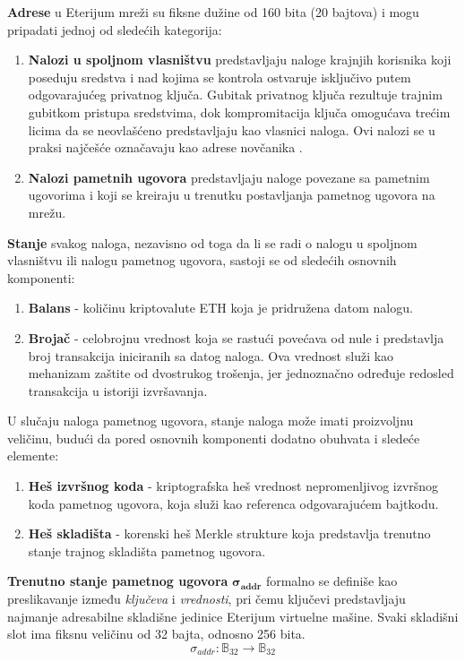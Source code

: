 \textbf{Adrese} u Eterijum mreži su fiksne dužine od 160 bita (20 bajtova) i mogu pripadati jednoj od sledećih kategorija:
\begin{enumerate}
\item \textbf{Nalozi u spoljnom vlasništvu}  predstavljaju naloge krajnjih korisnika koji poseduju sredstva i nad kojima se kontrola ostvaruje isključivo putem odgovarajućeg privatnog ključa. Gubitak privatnog ključa rezultuje trajnim gubitkom pristupa sredstvima, dok kompromitacija ključa omogućava trećim licima da se neovlašćeno predstavljaju kao vlasnici naloga. Ovi nalozi se u praksi najčešće označavaju kao adrese novčanika .
\item \textbf{Nalozi pametnih ugovora} predstavljaju naloge povezane sa pametnim ugovorima i koji se kreiraju u trenutku postavljanja pametnog ugovora na mrežu.
\end{enumerate}

\textbf{Stanje} svakog naloga, nezavisno od toga da li se radi o nalogu u spoljnom vlasništvu ili nalogu pametnog ugovora, sastoji se od sledećih osnovnih komponenti:
\begin{enumerate}
\item \textbf{Balans} - količinu kriptovalute ETH koja je pridružena datom nalogu.
\item \textbf{Brojač}  - celobrojnu vrednost koja se rastući povećava od nule i predstavlja broj transakcija iniciranih sa datog naloga. Ova vrednost služi kao mehanizam zaštite od dvostrukog trošenja, jer jednoznačno određuje redosled transakcija u istoriji izvršavanja.
\end{enumerate}

U slučaju naloga pametnog ugovora, stanje naloga može imati proizvoljnu veličinu, budući da pored osnovnih komponenti dodatno obuhvata i sledeće elemente:
\begin{enumerate}[start=3]
\item \textbf{Heš izvršnog koda}  - kriptografska heš vrednost nepromenljivog izvršnog koda pametnog ugovora, koja služi kao referenca odgovarajućem bajtkodu.
\item \textbf{Heš skladišta}  - korenski heš Merkle strukture koja predstavlja trenutno stanje trajnog skladišta pametnog ugovora.
\end{enumerate}

\textbf{Trenutno stanje pametnog ugovora} $\boldsymbol{\sigma_{addr}}$ formalno se definiše kao preslikavanje između \textit{ključeva} i \textit{vrednosti}, pri čemu ključevi predstavljaju najmanje adresabilne skladišne jedinice  Eterijum virtuelne mašine. Svaki skladišni slot ima fiksnu veličinu od 32 bajta, odnosno 256 bita.
$$ \sigma_{addr} : \mathbb{B}_{32} \to \mathbb{B}_{32} $$

